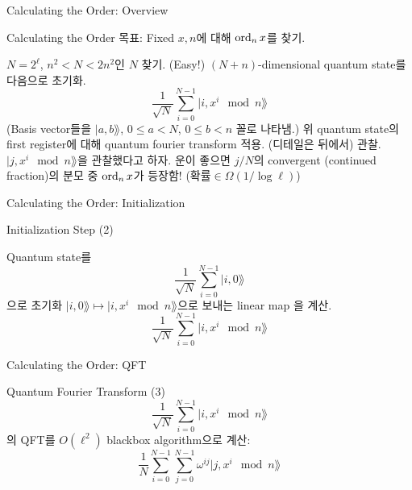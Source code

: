 \documentclass[../240513_msquare_shor.tex]{subfiles}
\begin{document}
\begin{frame}{Calculating the Order: Overview}
    \begin{block}{Calculating the Order}
        목표: Fixed \(x, n\)에 대해 \(\operatorname{ord}_n x\)를 찾기.
        \begin{enumerate}
            \ii
            \(N = 2^\ell\), \(n^2 < N < 2n^2\)인 \(N\) 찾기. (Easy!)
            \ii
            \((N + n)\)-dimensional quantum state를 다음으로 초기화.
            \[
                \frac{1}{\sqrt{N}} \sum_{i=0}^{N-1} | i, x^i \mod n \rang
            \]
            (Basis vector들을 \(|a, b \rang\), \(0 \le a < N\), \(0 \le b < n\) 꼴로 나타냄.)
            \ii
            위 quantum state의 first register에 대해 quantum fourier transform 적용.
            (디테일은 뒤에서)
            \ii
            관찰. \(| j, x^i \mod n \rang\)을 관찰했다고 하자.
            \ii
            운이 좋으면 \(j/N\)의 convergent (continued fraction)의 분모 중
            \(\operatorname{ord}_n x\)가 등장함! (\(\text{확률} \in \Omega(1/\log \ell)\))
        \end{enumerate}
    \end{block}
\end{frame}

\begin{frame}{Calculating the Order: Initialization}
    \begin{exampleblock}{Initialization Step (2)}
        \begin{enumerate}
            \ii
            Quantum state를
            \[
                \frac{1}{\sqrt{N}}\sum_{i=0}^{N-1} | i, 0 \rang
            \]
            으로 초기화
            \pause
            \ii
            \(| i, 0 \rang \mapsto |i, x^i \mod n \rang\)으로 보내는 linear map
            을 계산.\footnotemark 
            \[
                \frac{1}{\sqrt{N}}\sum_{i=0}^{N-1} | i, x^i \mod n \rang
            \]
        \end{enumerate}
    \end{exampleblock}
\end{frame}

\begin{frame}{Calculating the Order: QFT}
    \begin{exampleblock}{Quantum Fourier Transform (3)}
        \[
            \frac{1}{\sqrt{N}}\sum_{i=0}^{N-1} | i, x^i \mod n \rang
        \]
        의 QFT를 \(O(\ell^2)\) blackbox algorithm으로 계산:
        \pause
        \[
            \frac{1}{N}\sum_{i=0}^{N-1}\sum_{j=0}^{N-1} \omega^{ij} | j, x^i \mod n \rang
        \]
    \end{exampleblock}
\end{frame}
\end{document}
